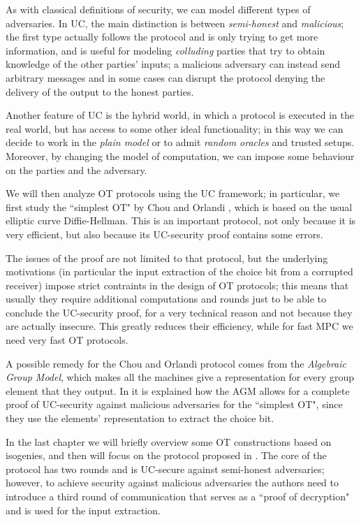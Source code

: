 As with classical definitions of security, we can model different types of adversaries. In UC, the main distinction is between \emph{semi-honest} and \emph{malicious}; the first type actually follows the protocol and is only trying to get more information, and is useful for modeling \emph{colluding} parties that try to obtain knowledge of the other parties' inputs; a malicious adversary can instead send arbitrary messages and in some cases can disrupt the protocol denying the delivery of the output to the honest parties.

Another feature of UC is the hybrid world, in which a protocol is executed in the real world, but has access to some other ideal functionality; in this way we can decide to work in the \emph{plain model} or to admit \emph{random oracles} and trusted setups. Moreover, by changing the model of computation, we can impose some behaviour on the parties and the adversary.

We will then analyze OT protocols using the UC framework; in particular, we first study the ``simplest OT" by Chou and Orlandi \cite{Chou_Orlandi}, which is based on the usual elliptic curve Diffie-Hellman. This is an important protocol, not only because it is very efficient, but also because its UC-security proof contains some errors.

The issues of the proof are not limited to that protocol, but the underlying motivations (in particular the input extraction of the choice bit from a corrupted receiver) impose strict contraints in the design of OT protocols; this means that usually they require additional computations and rounds just to be able to conclude the UC-security proof, for a very technical reason and not because they are actually insecure. This greatly reduces their efficiency, while for fast MPC we need very fast OT protocols.

A possible remedy for the Chou and Orlandi protocol comes from the \emph{Algebraic Group Model}, which makes all the machines give a representation for every group element that they output. In \cite{AGM_UC} it is explained how the AGM allows for a complete proof of UC-security against malicious adversaries for the ``simplest OT", since they use the elements' representation to extract the choice bit.

In the last chapter we will briefly overview some OT constructions based on isogenies, and then will focus on the protocol proposed in \cite{Lai_twists}. The core of the protocol has two rounds and is UC-secure against semi-honest adversaries; however, to achieve security against malicious adversaries the authors need to introduce a third round of communication that serves as a ``proof of decryption" and is used for the input extraction.

